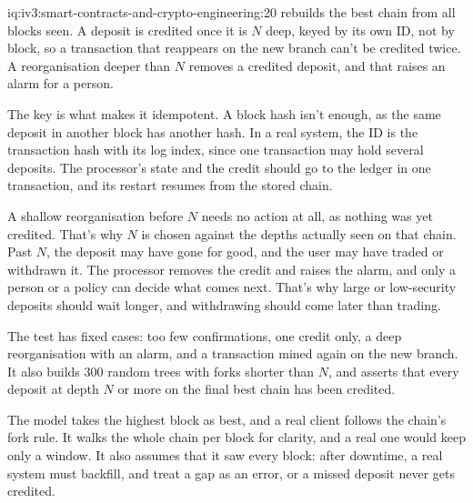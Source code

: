 \begin{solution}{iq:iv3:smart-contracts-and-crypto-engineering:20}
 rebuilds the best chain from all blocks seen. A deposit is credited once it is $N$ deep, keyed by its own ID, not by block, so a transaction that reappears on the new branch can't be credited twice. A reorganisation deeper than $N$ removes a credited deposit, and that raises an alarm for a person.
\label{lst:iv3:cr:deposits}

The key is what makes it idempotent. A block hash isn't enough, as the same deposit in another block has another hash. In a real system, the ID is the transaction hash with its log index, since one transaction may hold several deposits. The processor's state and the credit should go to the ledger in one transaction, and its restart resumes from the stored chain.

A shallow reorganisation before $N$ needs no action at all, as nothing was yet credited. That's why $N$ is chosen against the depths actually seen on that chain. Past $N$, the deposit may have gone for good, and the user may have traded or withdrawn it. The processor removes the credit and raises the alarm, and only a person or a policy can decide what comes next. That's why large or low-security deposits should wait longer, and withdrawing should come later than trading.

The test has fixed cases: too few confirmations, one credit only, a deep reorganisation with an alarm, and a transaction mined again on the new branch. It also builds 300 random trees with forks shorter than $N$, and asserts that every deposit at depth $N$ or more on the final best chain has been credited.

The model takes the highest block as best, and a real client follows the chain's fork rule. It walks the whole chain per block for clarity, and a real one would keep only a window. It also assumes that it saw every block: after downtime, a real system must backfill, and treat a gap as an error, or a missed deposit never gets credited.

\end{solution}

